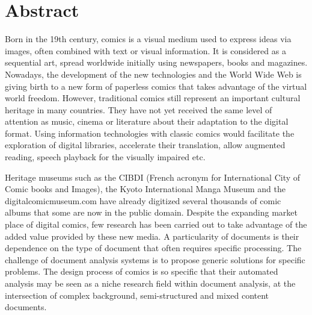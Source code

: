 \chapter*{Abstract}


Born in the 19th century, comics is a visual medium used to express ideas via images, often combined with text or visual information.
It is considered as a sequential art, spread worldwide initially using newspapers, books and magazines.
Nowadays, the development of the new technologies and the World Wide Web is giving birth to a new form of paperless comics that takes advantage of the virtual world freedom.
However, traditional comics still represent an important cultural heritage in many countries.
They have not yet received the same level of attention as music, cinema or literature about their adaptation to the digital format.
Using information technologies with classic comics would facilitate the exploration of digital libraries, accelerate their translation, allow augmented reading, speech playback for the visually impaired etc.

Heritage museums such as the CIBDI (French acronym for International City of Comic books and Images), the Kyoto International Manga Museum and the digitalcomicmuseum.com have already digitized several thousands of comic albums that some are now in the public domain.
Despite the expanding market place of digital comics, few research has been carried out to take advantage of the added value provided by these new media.
A particularity of documents is their dependence on the type of document that often requires specific processing.
The challenge of document analysis systems is to propose generic solutions for specific problems.
The design process of comics is so specific that their automated analysis may be seen as a niche research field within document analysis, at the intersection of complex background, semi-structured and mixed content documents.

